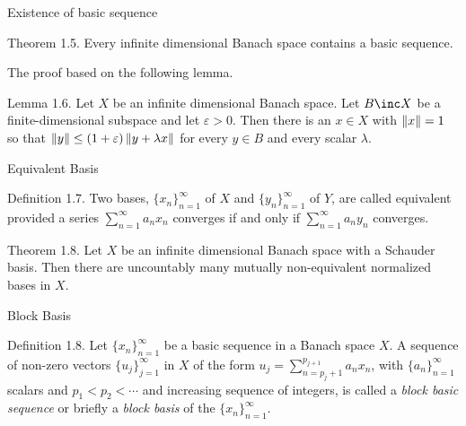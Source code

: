 \documentclass{beamer}
\begin{document}
\begin{frame}{Existence of basic sequence}
    \begin{block}{Theorem 1.5.}
        Every infinite dimensional Banach space contains a basic sequence.
    \end{block}
    The proof based on the following lemma.
    \begin{block}{Lemma 1.6.}
        Let $X$ be an infinite dimensional Banach space. Let $B\inc X$ be a finite-dimensional subspace and let $\varepsilon>0$.
	Then there is an $x\in X$ with $\left\lVert x \right\rVert=1$ so that $\left\lVert y \right\rVert\leq(1+\varepsilon)\left\lVert y+\lambda x \right\rVert$ for every $y\in B$ and every scalar $\lambda$.
    \end{block}
\end{frame}
\begin{frame}{Equivalent Basis}
    \begin{block}{Definition 1.7.}
        Two bases, $\{x_n\}_{n=1}^\infty$ of $X$ and $\{y_n\}_{n=1}^\infty$ of $Y$, are called equivalent provided a series $\sum_{n=1}^\infty a_nx_n$ converges if and only if $\sum_{n=1}^\infty a_ny_n$ converges.
    \end{block}
    \begin{block}{Theorem 1.8.}
        Let $X$ be an infinite dimensional Banach space with a Schauder basis. Then there are uncountably many mutually non-equivalent normalized bases in $X$.
    \end{block}
\end{frame}
\begin{frame}{Block Basis}
    \begin{block}{Definition 1.8.}
        Let $\{x_n\}_{n=1}^\infty$ be a basic sequence in a Banach space $X$.
    	A sequence of non-zero vectors $\{u_j\}_{j=1}^\infty$ in $X$ of the form $u_j=\sum_{n=p_j+1}^{p_{j+1}}a_nx_n$,
    	with $\{a_n\}_{n=1}^\infty$ scalars and $p_1<p_2<\cdots$ and increasing sequence of integers, 
    	is called a \textit{block basic sequence} or briefly a \textit{block basis} of the $\{x_n\}_{n=1}^\infty$.
    \end{block}
\end{frame}
\end{document}
